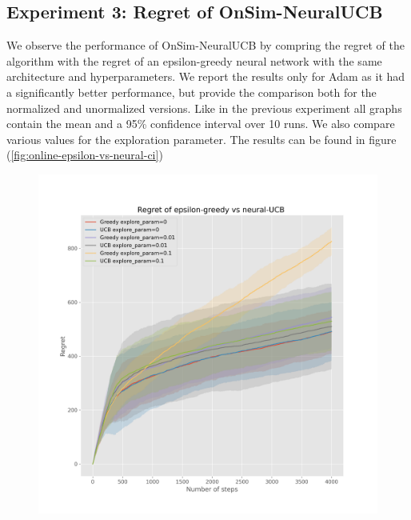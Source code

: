 \documentclass{article}
\begin{document}
\subsection{Experiment 3: Regret of OnSim-NeuralUCB}
We observe the performance of OnSim-NeuralUCB by compring the regret of the algorithm with the regret of an epsilon-greedy
neural network with the same architecture and hyperparameters. We report the results only for Adam as it had a significantly better performance,
but provide the comparison both for the normalized and unormalized versions.
Like in the previous experiment all graphs contain the mean and a 95\% confidence interval over 10 runs.
 We also compare various values for the exploration parameter. The results can be found in figure (\ref{fig:online-epsilon-vs-neural-ci})

\begin{figure}[!h]
  \centering
  \begin{minipage}{.45\textwidth}
    \centering
    \includegraphics[width=\linewidth]{online-epsilon-vs-neural-reduced-nonormalized-ci}
  \end{minipage}%
  \begin{minipage}{.45\textwidth}
    \centering

\end{minipage}
\end{figure}
\end{document}
